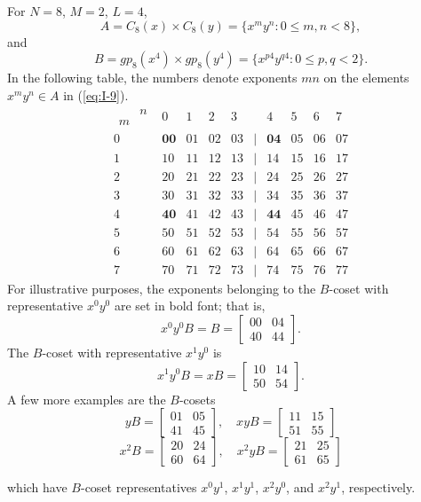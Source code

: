 \begin{example}
For $N=8$, $M=2$, $L=4$,
\begin{equation} \label{eq:I-9}
A = C_8(x) \times C_8(y) = \{x^m y^n : 0 \leq m,n < 8 \},
\end{equation}
and
\[
B = gp_8(x^4) \times gp_8(y^4) = \{x^{p4} y^{q4} : 0 \leq p,q < 2 \}.
\]
In the following table, the numbers denote exponents $mn$ on the
elements $x^my^n \in A$ in (\ref{eq:I-9}). 
\[
\begin{matrix}  
\begin{array}{cc} & n\\
                m & \end{array} & 0 & 1 & 2 & 3 &  & 4 & 5 & 6 & 7\\
0 & \mathbf{00} & 01 & 02 & 03 & | & \mathbf{04} & 05 & 06 & 07\\
1 & 10 & 11 & 12 & 13 & | & 14 & 15 & 16 & 17\\
2 & 20 & 21 & 22 & 23 & | & 24 & 25 & 26 & 27\\
3 & 30 & 31 & 32 & 33 & | & 34 & 35 & 36 & 37\\
\hline
4 & \mathbf{40} & 41 & 42 & 43 & | & \mathbf{44} & 45 & 46 & 47\\
5 & 50 & 51 & 52 & 53 & | & 54 & 55 & 56 & 57\\
6 & 60 & 61 & 62 & 63 & | & 64 & 65 & 66 & 67\\
7 & 70 & 71 & 72 & 73 & | & 74 & 75 & 76 & 77
\end{matrix}\]
For illustrative purposes, the exponents belonging to the
$B$-coset with representative $x^0y^0$ are set in bold font;
that is, 
\[
x^0y^0B = B = \begin{bmatrix} 00 & 04 \\ 40 & 44 \end{bmatrix}.
\]
The $B$-coset with representative $x^1y^0$ is 
\[
x^1y^0B = xB = \begin{bmatrix}10 & 14 \\ 50 & 54 \end{bmatrix}.
\]
A few more examples are the $B$-cosets
\[
yB = \begin{bmatrix} 01 & 05 \\ 41 & 45 \end{bmatrix}, \quad
xyB = \begin{bmatrix} 11 & 15 \\ 51 & 55 \end{bmatrix}
\]
\[
x^2B = \begin{bmatrix} 20 & 24 \\ 60 & 64 \end{bmatrix}, \quad
x^2yB = \begin{bmatrix} 21 & 25 \\ 61 & 65 \end{bmatrix}
\]
\end{example}
which have $B$-coset representatives $x^0y^1$,
$x^1y^1$, $x^2y^0$, and $x^2y^1$, respectively.
